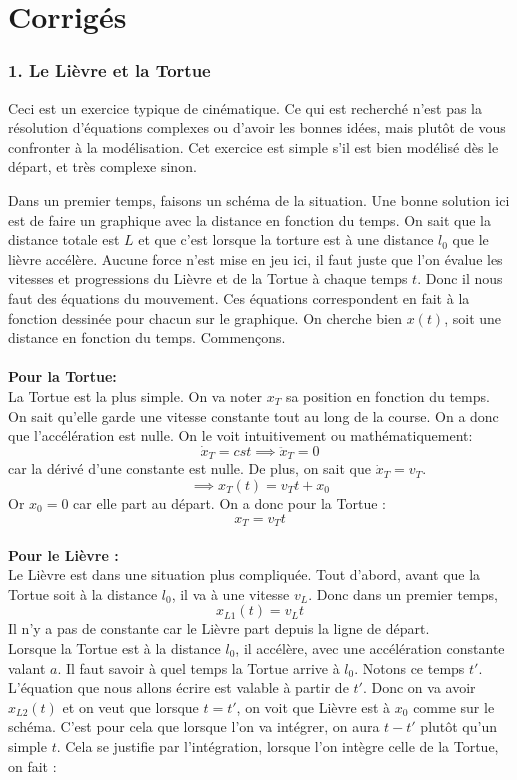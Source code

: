 \documentclass[a4paper,10pt,twoside]{article}
\begin{document}
\section*{Corrigés}
    
    
\subsubsection*{1. Le Lièvre et la Tortue}
Ceci est un exercice typique de cinématique. Ce qui est recherché n'est pas la résolution d'équations complexes ou d'avoir les bonnes idées, mais plutôt de vous confronter à la modélisation. Cet exercice est simple s'il est bien modélisé dès le départ, et très complexe sinon.

Dans un premier temps, faisons un schéma de la situation. Une bonne solution ici est de faire un graphique avec la distance en fonction du temps. On sait que la distance totale est $L$ et que c'est lorsque la torture est à une distance $l_0$ que le lièvre accélère. Aucune force n'est mise en jeu ici, il faut juste que l'on évalue les vitesses et progressions du Lièvre et de la Tortue à chaque temps $t$. Donc il nous faut des équations du mouvement. Ces équations correspondent en fait à la fonction dessinée pour chacun sur le graphique. On cherche bien $x(t)$, soit une distance en fonction du temps. Commençons.\\
\\
\textbf{Pour la Tortue:}\\
La Tortue est la plus simple. On va noter $x_T$ sa position en fonction du temps. On sait qu'elle garde une vitesse constante tout au long de la course. On a donc que l'accélération est nulle. On le voit intuitivement ou mathématiquement: 
\[ \dot{x}_T=cst \implies \ddot{x}_T=0 \]
car la dérivé d'une constante est nulle.
De plus, on sait que $\dot{x}_T= v_T$.
\[\implies x_T(t)=v_T t+x_0\]
Or $x_0=0$ car elle part au départ. On a donc pour la Tortue :
\[ x_T=v_T t\]
\\
\textbf{Pour le Lièvre :} \\
Le Lièvre est dans une situation plus compliquée. Tout d'abord, avant que la Tortue soit à la distance $l_0$, il va à une vitesse $v_L$. Donc dans un premier temps, \[x_{L1}(t)=v_L t \]
Il n'y a pas de constante car le Lièvre part depuis la ligne de départ. \\
Lorsque la Tortue est à la distance $l_0$, il accélère, avec une accélération constante valant $a$. Il faut savoir à quel temps la Tortue arrive à $l_0$. Notons ce temps $t'$. L'équation que nous allons écrire est valable à partir de $t'$. Donc on va avoir $x_{L2}(t)$ et on veut que lorsque $t=t'$, on voit que Lièvre est à $x_0$ comme sur le schéma. C'est pour cela que lorsque l'on va intégrer, on aura $t-t'$ plutôt qu'un simple $t$. Cela se justifie par l'intégration, lorsque l'on intègre celle de la Tortue, on fait :
\end{document}
